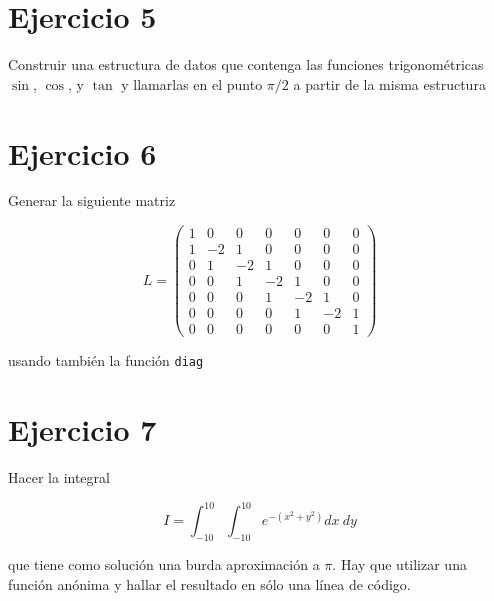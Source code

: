 \documentclass[a4]{article}
\begin{document}
\section*{Ejercicio 5}

Construir una estructura de datos que contenga las funciones
trigonométricas $\sin$, $\cos$, y $\tan$ y llamarlas en el punto
$\pi/2$ a partir de la misma estructura

\section*{Ejercicio 6}

Generar la siguiente matriz

\[
L = \left( \begin{array}{ccccccc}
1&0&0&0&0&0&0\\
1&-2&1&0&0&0&0\\
0&1&-2&1&0&0&0\\
0&0&1&-2&1&0&0\\
0&0&0&1&-2&1&0\\
0&0&0&0&1&-2&1\\
0&0&0&0&0&0&1
\end{array} \right)
\]

usando también la función \texttt{diag}

\section*{Ejercicio 7}

Hacer la integral

\[ I=\int_{-10}^{10}\int_{-10}^{10}e^{-(x^2+y^2)}dx\ dy \]

que tiene como solución una burda aproximación a $\pi$.  Hay que
utilizar una función anónima y hallar el resultado en sólo una línea
de código.
\end{document}
